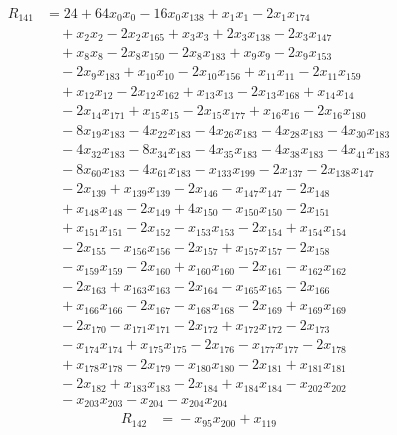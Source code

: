 \begin{align*}
R_{141}&={}24 +64x_{0}x_{0} -16x_{0}x_{138} +x_{1}x_{1} -2x_{1}x_{174}\\
&\quad{}+x_{2}x_{2} -2x_{2}x_{165} +x_{3}x_{3} +2x_{3}x_{138} -2x_{3}x_{147}\\
&\quad{}+x_{8}x_{8} -2x_{8}x_{150} -2x_{8}x_{183} +x_{9}x_{9} -2x_{9}x_{153}\\
&\quad{}-2x_{9}x_{183} +x_{10}x_{10} -2x_{10}x_{156} +x_{11}x_{11} -2x_{11}x_{159}\\
&\quad{}+x_{12}x_{12} -2x_{12}x_{162} +x_{13}x_{13} -2x_{13}x_{168} +x_{14}x_{14}\\
&\quad{}-2x_{14}x_{171} +x_{15}x_{15} -2x_{15}x_{177} +x_{16}x_{16} -2x_{16}x_{180}\\
&\quad{}-8x_{19}x_{183} -4x_{22}x_{183} -4x_{26}x_{183} -4x_{28}x_{183} -4x_{30}x_{183}\\
&\quad{}-4x_{32}x_{183} -8x_{34}x_{183} -4x_{35}x_{183} -4x_{38}x_{183} -4x_{41}x_{183}\\
&\quad{}-8x_{60}x_{183} -4x_{61}x_{183} -x_{133}x_{199} -2x_{137} -2x_{138}x_{147}\\
&\quad{}-2x_{139} +x_{139}x_{139} -2x_{146} -x_{147}x_{147} -2x_{148}\\
&\quad{}+x_{148}x_{148} -2x_{149} +4x_{150} -x_{150}x_{150} -2x_{151}\\
&\quad{}+x_{151}x_{151} -2x_{152} -x_{153}x_{153} -2x_{154} +x_{154}x_{154}\\
&\quad{}-2x_{155} -x_{156}x_{156} -2x_{157} +x_{157}x_{157} -2x_{158}\\
&\quad{}-x_{159}x_{159} -2x_{160} +x_{160}x_{160} -2x_{161} -x_{162}x_{162}\\
&\quad{}-2x_{163} +x_{163}x_{163} -2x_{164} -x_{165}x_{165} -2x_{166}\\
&\quad{}+x_{166}x_{166} -2x_{167} -x_{168}x_{168} -2x_{169} +x_{169}x_{169}\\
&\quad{}-2x_{170} -x_{171}x_{171} -2x_{172} +x_{172}x_{172} -2x_{173}\\
&\quad{}-x_{174}x_{174} +x_{175}x_{175} -2x_{176} -x_{177}x_{177} -2x_{178}\\
&\quad{}+x_{178}x_{178} -2x_{179} -x_{180}x_{180} -2x_{181} +x_{181}x_{181}\\
&\quad{}-2x_{182} +x_{183}x_{183} -2x_{184} +x_{184}x_{184} -x_{202}x_{202}\\
&\quad{}-x_{203}x_{203} -x_{204} -x_{204}x_{204}
\end{align*}
\begin{align*}
R_{142}&={}-x_{95}x_{200} +x_{119}
\end{align*}
